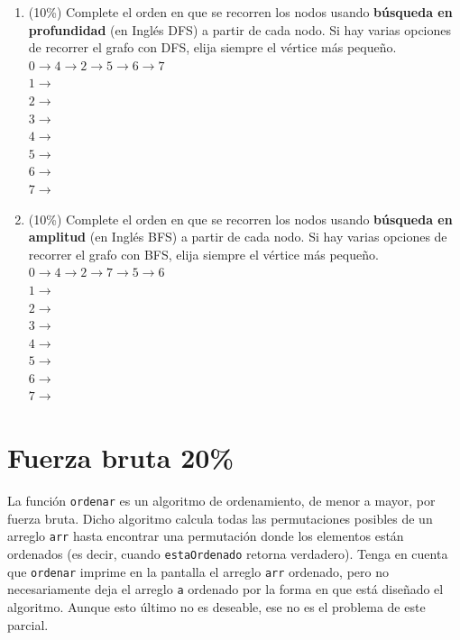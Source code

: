 \documentclass[twocolumn]{article}
\begin{document}
\begin{enumerate}[label=\Alph*]
	\item (10\%) Complete el orden en que se recorren los nodos usando \textbf{búsqueda en profundidad} (en Inglés DFS) a partir de cada nodo. Si hay varias opciones de recorrer el grafo con DFS, elija siempre el vértice más pequeño.\\


$0 \rightarrow 4 \rightarrow 2 \rightarrow 5 \rightarrow 6 \rightarrow 7 $\\
$1 \rightarrow$\\
$2 \rightarrow$\\
$3 \rightarrow$\\
$4 \rightarrow$\\
$5 \rightarrow$\\
$6 \rightarrow$\\
$7 \rightarrow$\\


\item (10\%) Complete el orden en que se recorren los nodos usando \textbf{búsqueda en amplitud} (en Inglés BFS) a partir de cada nodo. Si hay varias opciones de recorrer el grafo con BFS, elija siempre el vértice más pequeño.\\


$0 \rightarrow 4 \rightarrow 2 \rightarrow 7 \rightarrow 5 \rightarrow 6 $\\
$1 \rightarrow$\\
$2 \rightarrow$\\
$3 \rightarrow$\\
$4 \rightarrow$\\
$5 \rightarrow$\\
$6 \rightarrow$\\
$7 \rightarrow$\\


\end{enumerate}

\section{Fuerza bruta 20\%}

La función \texttt{ordenar} es un algoritmo de ordenamiento, de menor a mayor, por fuerza bruta. Dicho algoritmo calcula todas
las permutaciones posibles de un arreglo \texttt{arr} hasta
encontrar una permutación donde los elementos están ordenados (es decir, cuando \texttt{estaOrdenado} retorna verdadero).
Tenga en cuenta que \texttt{ordenar} imprime en la pantalla el arreglo \texttt{arr} ordenado, pero no necesariamente deja el arreglo
\texttt{a} ordenado por la forma en que está diseñado el algoritmo. Aunque esto último no es deseable, ese no es el problema de este parcial.
\end{document}
